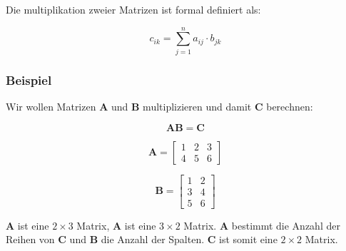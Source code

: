 Die multiplikation zweier Matrizen ist formal definiert als:

\begin{equation}
{\displaystyle c_{ik}=\sum _{j=1}^{n}a_{ij}\cdot b_{jk}}
\end{equation}


\subsubsection{Beispiel}

Wir wollen Matrizen $\mathbf{A}$ und $\mathbf{B}$ multiplizieren und damit $\mathbf{C}$ berechnen:

\begin{equation}
\mathbf{AB}  = \mathbf{C}
\end{equation}

\begin{equation}
\mathbf{A}  = \left[\begin{matrix}1 & 2 & 3 \\ 4 & 5 & 6\end{matrix}\right]
\end{equation}

\begin{equation}
\mathbf{B}  = \left[ \begin{matrix}1 & 2\\3 & 4\\5 & 6 \end{matrix} \right]
\end{equation}


$\mathbf{A}$ ist eine $2 \times 3$ Matrix, $\mathbf{A}$ ist eine $3 \times 2$ Matrix. $\mathbf{A}$ bestimmt die Anzahl der Reihen von $\mathbf{C}$ und $\mathbf{B}$ die Anzahl der Spalten. $\mathbf{C}$ ist somit eine $2 \times 2$ Matrix.




